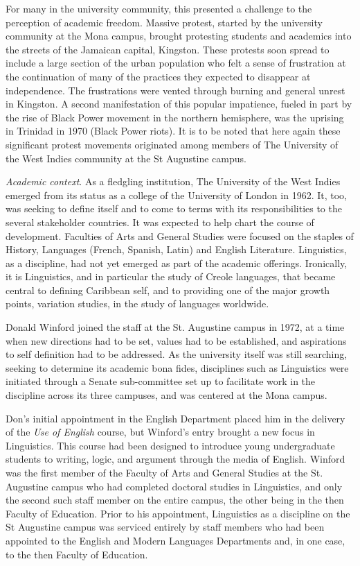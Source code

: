 \documentclass[output=paper, colorlinks,citecolor=brown]{langscibook}
\begin{document}
For many in the university community, this presented a challenge to the perception of academic freedom. Massive protest, started by the university community at the Mona campus, brought protesting students and academics into the streets of the Jamaican capital, Kingston. These protests soon spread to include a large section of the urban population who felt a sense of frustration at the continuation of many of the practices they expected to disappear at independence. The frustrations were vented through burning and general unrest in Kingston. A second manifestation of this popular impatience, fueled in part by the rise of Black Power movement in the northern hemisphere, was the uprising in Trinidad in 1970 (Black Power riots). It is to be noted that here again these significant protest movements originated among members of The University of the West Indies community at the St Augustine campus.

\textit{Academic context}. As a fledgling institution, The University of the West Indies emerged from its status as a college of the University of London in 1962. It, too, was seeking to define itself and to come to terms with its responsibilities to the several stakeholder countries. It was expected to help chart the course of development. Faculties of Arts and General Studies were focused on the staples of History, Languages (French, Spanish, Latin) and English Literature. Linguistics, as a discipline, had not yet emerged as part of the academic offerings. Ironically, it is Linguistics, and in particular the study of Creole languages, that became central to defining Caribbean self, and to providing one of the major growth points, variation studies, in the study of languages worldwide. 


Donald Winford joined the staff at the St. Augustine campus in 1972, at a time when new directions had to be set, values had to be established, and aspirations to self definition had to be addressed.  As the university itself was still searching, seeking to determine its academic bona fides, disciplines such as Linguistics were initiated through a Senate sub-committee set up to facilitate work in the discipline across its three campuses, and  was centered at the Mona campus. 

Don's initial appointment in the English Department placed him in the delivery of the \textit{Use of English} course, but Winford’s entry brought a new focus in Linguistics. This course had been designed to introduce young undergraduate students to writing, logic, and argument through the media of English. Winford was the first member of the Faculty of Arts and General Studies at the St. Augustine campus who had completed doctoral studies in Linguistics, and only the second such staff member on the entire campus, the other being in the then Faculty of Education. Prior to his appointment, Linguistics as a discipline on the St Augustine campus was serviced entirely by staff members who had been appointed to the English and Modern Languages Departments and, in one case, to the then Faculty of Education.
\end{document}
